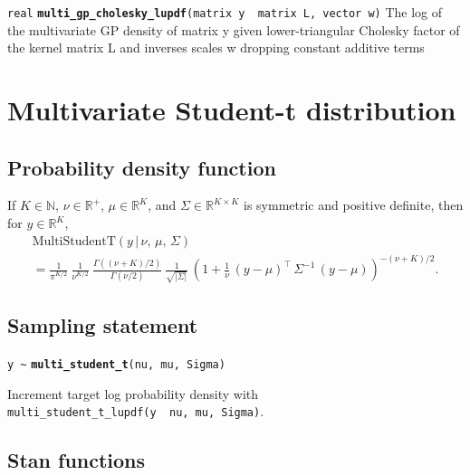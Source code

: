 \documentclass[
  10pt,
]{book}
\begin{document}

\texttt{real} \textbf{\texttt{multi\_gp\_cholesky\_lupdf}}\texttt{(matrix\ y\ \textbar{}\ matrix\ L,\ vector\ w)}\newline
The log of the multivariate GP density of matrix y given
lower-triangular Cholesky factor of the kernel matrix L and inverses
scales w dropping constant additive terms

\hypertarget{multivariate-student-t-distribution}{%
\section{Multivariate Student-t distribution}\label{multivariate-student-t-distribution}}

\hypertarget{probability-density-function-30}{%
\subsection{Probability density function}\label{probability-density-function-30}}

If \(K \in \mathbb{N}\), \(\nu \in \mathbb{R}^+\), \(\mu \in \mathbb{R}^K\),
and \(\Sigma \in \mathbb{R}^{K \times K}\) is symmetric and positive
definite, then for \(y \in \mathbb{R}^K\), \[ \begin{array}{l}
\text{MultiStudentT}(y\,|\,\nu,\,\mu,\,\Sigma) \\  =
\frac{1}{\pi^{K/2}} \ \frac{1}{\nu^{K/2}} \ \frac{\Gamma\!\left((\nu +
K)/2\right)}      {\Gamma(\nu/2)} \ \frac{1}{\sqrt{\left| \Sigma
\right|}} \ \left( 1 + \frac{1}{\nu} \, \left(y - \mu\right)^{\top} \,
\Sigma^{-1} \, \left(y - \mu\right) \right)^{-(\nu + K)/2} \! .
\end{array} \]

\hypertarget{sampling-statement-54}{%
\subsection{Sampling statement}\label{sampling-statement-54}}

\texttt{y\ \textasciitilde{}} \textbf{\texttt{multi\_student\_t}}\texttt{(nu,\ mu,\ Sigma)}

Increment target log probability density with \texttt{multi\_student\_t\_lupdf(y\ \textbar{}\ nu,\ mu,\ Sigma)}.

\hypertarget{stan-functions-53}{%
\subsection{Stan functions}\label{stan-functions-53}}
\end{document}
